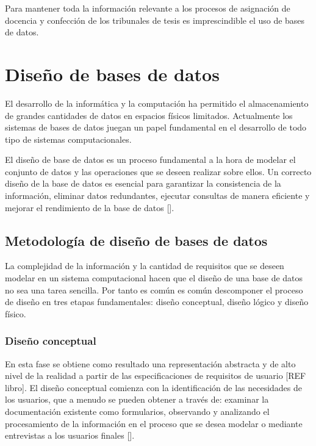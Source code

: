 



Para mantener toda la información relevante a los procesos de 
asignación de docencia y confección de los tribunales de tesis 
es imprescindible el uso de bases de datos.


\section{Diseño de bases de datos}
El desarrollo de la informática y la computación ha permitido
el almacenamiento de grandes cantidades de datos en espacios 
físicos limitados. Actualmente los sistemas de bases de datos juegan
un papel fundamental en el desarrollo de todo tipo de sistemas computacionales.

El diseño de base de datos es un proceso fundamental a la hora 
de modelar el conjunto de datos y las operaciones que se deseen
realizar sobre ellos. Un correcto diseño de la base de datos
es esencial para garantizar la consistencia de la información,
eliminar datos redundantes, ejecutar consultas de manera 
eficiente y mejorar el rendimiento de la base de datos [\cite{db_book_cap2}]. 

\subsection{Metodología de diseño de bases de datos}
La complejidad de la información y la cantidad de requisitos que se 
deseen modelar en un sistema computacional hacen que el diseño de una 
base de datos no sea una tarea sencilla. Por tanto es común es común 
descomponer el proceso de diseño en tres etapas fundamentales: diseño conceptual,
diseño lógico y diseño físico. 


\subsubsection{Diseño conceptual}
En esta fase se obtiene como resultado una representación 
abstracta y de alto nivel de la realidad a partir de las 
especificaciones de requisitos de usuario [REF libro]. El diseño
conceptual comienza con la identificación de las necesidades de los 
usuarios, que a menudo se pueden obtener a través de: examinar
la documentación existente como formularios, observando y
analizando el procesamiento de la información en el proceso que 
se desea modelar o mediante entrevistas a los usuarios finales [\cite{db_requirement_analysis}].

